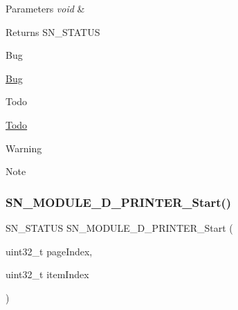 \begin{DoxyParams}{Parameters}
{\em void} & \\
\hline
\end{DoxyParams}
\begin{DoxyReturn}{Returns}
S\+N\+\_\+\+S\+T\+A\+T\+US 
\end{DoxyReturn}
\begin{DoxyRefDesc}{Bug}
\item[\hyperlink{bug__bug000007}{Bug}]\end{DoxyRefDesc}
\begin{DoxyRefDesc}{Todo}
\item[\hyperlink{todo__todo000007}{Todo}]\end{DoxyRefDesc}
\begin{DoxyWarning}{Warning}

\end{DoxyWarning}
\begin{DoxyNote}{Note}

\end{DoxyNote}
\mbox{\label{group__Module_ga439ebb10f8ee839218655c5177e9110b}} 
\subsubsection{\texorpdfstring{S\+N\+\_\+\+M\+O\+D\+U\+L\+E\+\_\+D\+\_\+\+P\+R\+I\+N\+T\+E\+R\+\_\+\+Start()}{SN\_MODULE\_3D\_PRINTER\_Start()}}
{\footnotesize\ttfamily S\+N\+\_\+\+S\+T\+A\+T\+US S\+N\+\_\+\+M\+O\+D\+U\+L\+E\+\_\+D\+\_\+\+P\+R\+I\+N\+T\+E\+R\+\_\+\+Start (\begin{DoxyParamCaption}\item[{uint32\+\_\+t}]{page\+Index,  }\item[{uint32\+\_\+t}]{item\+Index }\end{DoxyParamCaption})}


